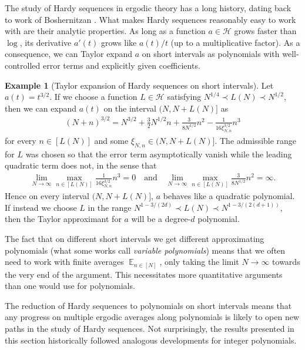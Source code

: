 \documentclass[11pt]{amsart}
\theoremstyle{definition}
\newtheorem{example}[lemma]{Example}
\DeclareMathOperator*{\E}{\mathbb{E}}
\newcommand{\CH}{{\mathcal H}}
\newcommand{\1}{{\mathbf{1}}}
\begin{document}
The study of Hardy sequences in ergodic theory has a long history, dating back to work of Boshernitzan \cite{Boshernitzan-equidistribution}. %
What makes Hardy sequences reasonably easy to work with are their analytic properties. As long as a function $a\in\CH$ grows faster than $\log$, its derivative $a'(t)$ grows like $a(t)/t$ (up to a multiplicative factor).
As a consequence, we can Taylor expand $a$ on short intervals %
as polynomials with well-controlled error terms and explicitly given coefficients.
\begin{example}[Taylor expansion of Hardy sequences on short intervals]
    Let $a(t) = t^{3/2}$. If we choose a function $L\in\CH$ satisfying $N^{1/4}\prec L(N)\prec N^{1/2}$, then we can expand $a(t)$ on the interval $(N, N + L(N)]$ as
    \begin{align*}
        (N+n)^{3/2} = N^{3/2} + \frac{3}{2}N^{1/2}n + \frac{3}{8 N^{1/2}}n^2 - \frac{1}{16\xi_{N,n}^{3/2}}n^3
    \end{align*}
    for every $n\in[L(N)]$ and some $\xi_{N,n}\in(N, N+L(N)]$. The admissible range for $L$ was chosen so that the error term asymptotically vanish while the leading quadratic term does not, in the sense that
    \begin{align*}
        \lim_{N\to\infty}\max_{n\in[L(N)]}\frac{1}{16\xi_{N,n}^{3/2}}n^3 = 0\quad \textrm{and}\quad \lim_{N\to\infty}\max_{n\in[L(N)]} \frac{3}{8 N^{1/2}}n^2 = \infty.
    \end{align*}
    Hence on every interval $(N, N + L(N)]$, $a$ behaves like a quadratic polynomial. If instead we choose $L$ in the range $N^{1-3/(2d)}\prec L(N)\prec N^{1-3/(2(d+1))}$, then the Taylor approximant for $a$ will be a degree-$d$ polynomial.
\end{example}
The fact that on different short intervals we get different approximating polynomials (what some works \cite{Fr16, FrW09, Kouts22} call \emph{variable polynomials}) means that we often need to work with finite averages $\E_{n\in[N]}$, only taking the limit $N\to\infty$ towards the very end of the argument. This necessitates more quantitative arguments than one would use for polynomials. 

The reduction of Hardy sequences to polynomials on short intervals means that any progress on multiple ergodic averages along polynomials is likely to open new paths in the study of Hardy sequences. Not surprisingly, the results presented in this section historically followed analogous developments for integer polynomials. 
\end{document}
